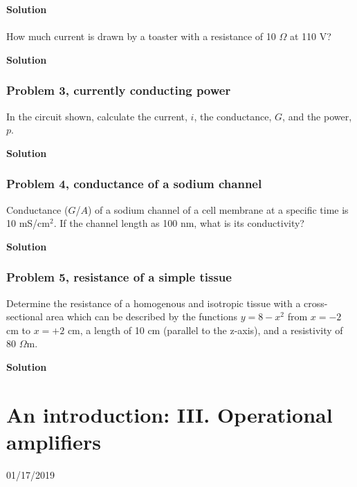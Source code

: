 \documentclass[11pt]{book}
\begin{document}
\textbf{Solution}
\\
\\
How much current is drawn by a toaster with a resistance of 10 $\Omega$ at 110 V?

\textbf{Solution}

\subsection{Problem 3, currently conducting power}
In the circuit shown, calculate the current, $i$, the conductance, $G$, and the power, $p$.

\textbf{Solution}


\subsection{Problem 4, conductance of a sodium channel}
Conductance ($G$/$A$) of a sodium channel of a cell membrane at a specific time is 10 mS/cm$^{2}$. If the channel length as 100 nm, what is its conductivity?

\textbf{Solution}


\subsection{Problem 5, resistance of a simple tissue}
Determine the resistance of a homogenous and isotropic tissue with a cross-sectional area which can be described by the functions $y = 8 - x^2$ from $x = -2$ cm to $x = +2$ cm, a length of 10 cm (parallel to the z-axis), and a resistivity of 80 $\Omega$m.

\textbf{Solution}




\chapter{An introduction: III. Operational amplifiers}
01/17/2019 
\minitoc
\end{document}
